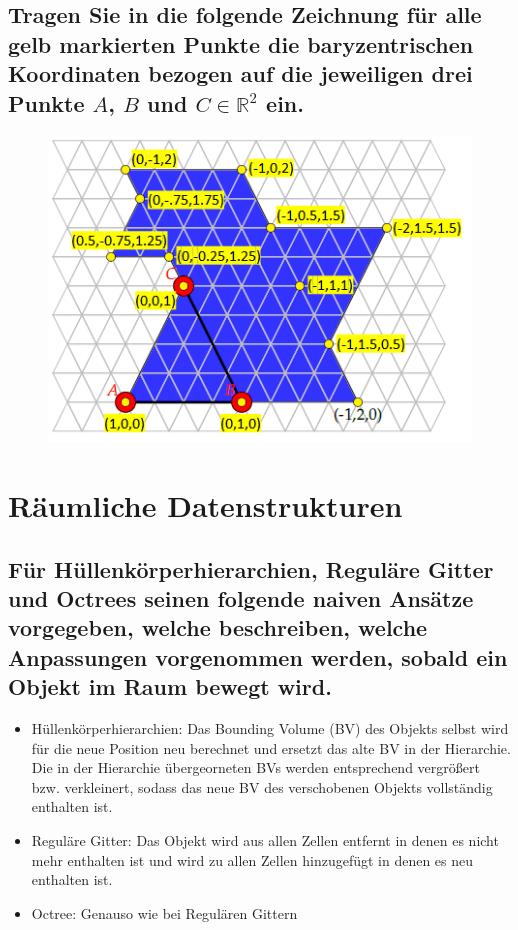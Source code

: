\documentclass[a4paper,10pt,DIV=14]{article}
\begin{document}
\subsection{Tragen Sie in die folgende Zeichnung für alle gelb markierten Punkte die baryzentrischen Koordinaten bezogen auf die jeweiligen drei Punkte $A$, $B$ und $C \in \mathbb{R}^2$ ein.}

\begin{figure}[!htbp]
	\centering						
	\includegraphics[width=0.95\linewidth]{map2}
\end{figure}


\section{Räumliche Datenstrukturen}

\subsection{Für Hüllenkörperhierarchien, Reguläre Gitter und Octrees seinen folgende naiven Ansätze vorgegeben, welche beschreiben, welche Anpassungen vorgenommen werden, sobald ein Objekt im Raum bewegt wird.}

\begin{itemize}
	\item Hüllenkörperhierarchien: Das Bounding Volume (BV) des Objekts selbst wird für die neue Position neu berechnet und ersetzt das alte BV in der Hierarchie. Die in der Hierarchie übergeorneten BVs werden entsprechend vergrößert bzw. verkleinert, sodass das neue BV des verschobenen Objekts vollständig enthalten ist.
	\item Reguläre Gitter: Das Objekt wird aus allen Zellen entfernt in denen es nicht mehr enthalten ist und wird zu allen Zellen hinzugefügt in denen es neu enthalten ist.
	\item Octree: Genauso wie bei Regulären Gittern
\end{itemize}
\end{document}
